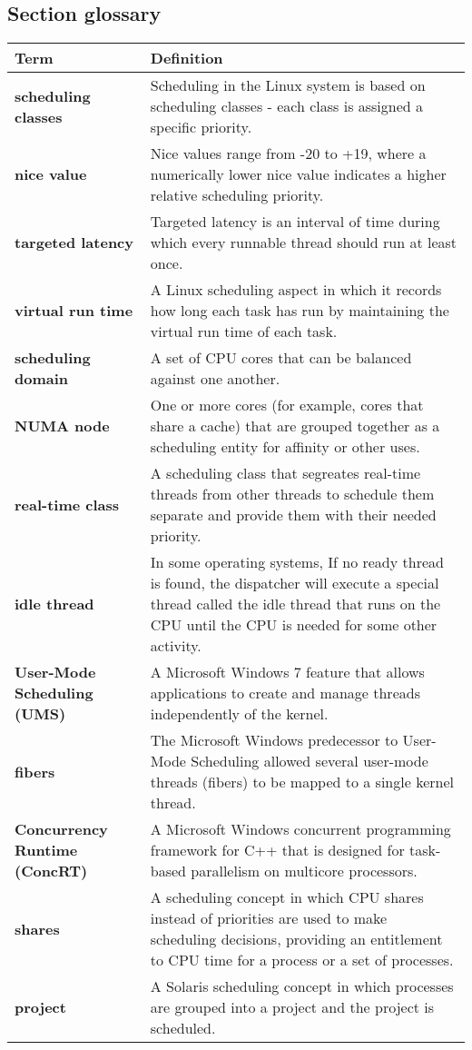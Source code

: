 \subsection*{Section glossary}
\centering
\begin{tabular}{>{\raggedright}p{} >{\raggedright\arraybackslash}p{}}
\toprule
\textbf{Term} & \textbf{Definition} \\
\midrule
\textbf{scheduling classes} & Scheduling in the Linux system is based on scheduling classes - each class is assigned a specific priority. \\
\textbf{nice value} & Nice values range from -20 to +19, where a numerically lower nice value indicates a higher relative scheduling priority. \\
\textbf{targeted latency} & Targeted latency is an interval of time during which every runnable thread should run at least once. \\
\textbf{virtual run time} & A Linux scheduling aspect in which it records how long each task has run by maintaining the virtual run time of each task. \\
\textbf{scheduling domain} & A set of CPU cores that can be balanced against one another. \\
\textbf{NUMA node} & One or more cores (for example, cores that share a cache) that are grouped together as a scheduling entity for affinity or other uses. \\
\textbf{real-time class} & A scheduling class that segreates real-time threads from other threads to schedule them separate and provide them with their needed priority. \\
\textbf{idle thread} & In some operating systems, If no ready thread is found, the dispatcher will execute a special thread called the idle thread that runs on the CPU until the CPU is needed for some other activity. \\
\textbf{User-Mode Scheduling (UMS)} & A Microsoft Windows 7 feature that allows applications to create and manage threads independently of the kernel. \\
\textbf{fibers} & The Microsoft Windows predecessor to User-Mode Scheduling allowed several user-mode threads (fibers) to be mapped to a single kernel thread. \\
\textbf{Concurrency Runtime (ConcRT)} & A Microsoft Windows concurrent programming framework for C++ that is designed for task-based parallelism on multicore processors. \\
\textbf{shares} & A scheduling concept in which CPU shares instead of priorities are used to make scheduling decisions, providing an entitlement to CPU time for a process or a set of processes. \\
\textbf{project} & A Solaris scheduling concept in which processes are grouped into a project and the project is scheduled. \\
\bottomrule
\end{tabular}
\vspace{\baselineskip}

